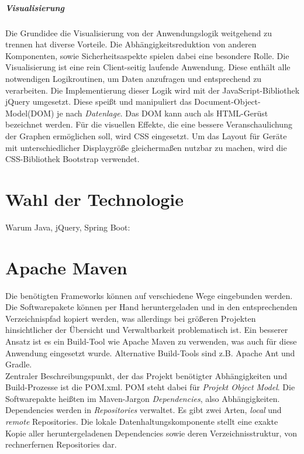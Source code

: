 \subparagraph{Visualisierung}
Die Grundidee die Visualisierung von der Anwendungslogik weitgehend zu trennen hat diverse Vorteile. Die Abhängigkeitsreduktion von anderen Komponenten, sowie Sicherheitsaspekte spielen dabei eine besondere Rolle. 
Die Visualisierung ist eine rein Client-seitig laufende Anwendung. Diese enthält alle notwendigen Logikroutinen, um Daten anzufragen und entsprechend zu verarbeiten. Die Implementierung dieser Logik wird mit der JavaScript-Bibliothek jQuery umgesetzt. Diese speißt und manipuliert das Document-Object-Model(DOM) je nach \emph{Datenlage}. Das DOM kann auch als HTML-Gerüst bezeichnet werden. Für die visuellen Effekte, die eine bessere Veranschaulichung der Graphen ermöglichen soll, wird CSS eingesetzt. Um das Layout für Geräte mit unterschiedlicher Displaygröße gleichermaßen nutzbar zu machen, wird die CSS-Bibliothek Bootstrap verwendet. 


\section{Wahl der Technologie}
Warum Java, jQuery, Spring Boot: 

\section{Apache Maven}
Die benötigten Frameworks können auf verschiedene Wege eingebunden werden. Die Softwarepakete können per Hand heruntergeladen und in den entsprechenden Verzeichnispfad kopiert werden, was allerdings bei größeren Projekten hinsichtlicher der Übersicht und Verwaltbarkeit problematisch ist. Ein besserer Ansatz ist es ein Build-Tool wie Apache Maven zu verwenden, was auch für diese Anwendung eingesetzt wurde. Alternative Build-Tools sind z.B. Apache Ant und Gradle.\\
Zentraler Beschreibungspunkt, der das Projekt benötigter Abhängigkeiten und Build-Prozesse ist die POM.xml. POM steht dabei für \emph{Projekt Object Model}.
Die Softwarepakte heißten im Maven-Jargon \emph{Dependencies}, also Abhängigkeiten. Dependencies werden in \emph{Repositories} verwaltet. Es gibt zwei Arten, \emph{local} und \emph{remote} Repositories.   
Die lokale Datenhaltungskomponente stellt eine exakte Kopie aller heruntergeladenen Dependencies sowie deren Verzeichnisstruktur, von rechnerfernen Repositories dar.\\

